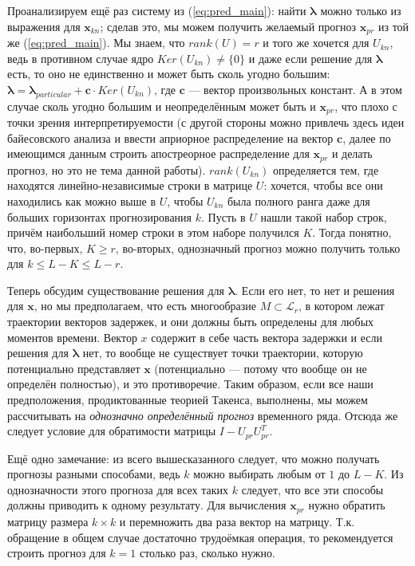 			 Проанализируем ещё раз систему из (\ref{eq:pred_main}): найти $ \boldsymbol{\lambda} $ можно только из выражения для $ \mathbf{x}_{kn} $; сделав это, мы можем получить желаемый прогноз $ \mathbf{x}_{pr} $ из той же (\ref{eq:pred_main}). Мы знаем, что $ rank(U) = r $ и того же хочется для $ U_{kn} $, ведь в противном случае ядро $ Ker(U_{kn}) \not= \{0\} $ и даже если решение для $ \boldsymbol{\lambda} $ есть, то оно не единственно и может быть сколь угодно большим: $ \boldsymbol{\lambda} = \boldsymbol{\lambda}_{particular} + \mathbf{c} \cdot Ker(U_{kn}) $, где $ \mathbf{c} $ --- вектор произвольных констант. А в этом случае сколь угодно большим и неопределённым может быть и $ \mathbf{x}_{pr} $, что плохо с точки зрения интерпретируемости (с другой стороны можно привлечь здесь идеи байесовского анализа и ввести априорное распределение на вектор $ \mathbf{c} $, далее по имеющимся данным строить апостреорное распределение для $ \mathbf{x}_{pr} $ и делать прогноз, но это не тема данной работы). $ rank(U_{kn}) $ определяется тем, где находятся линейно-независимые строки в матрице $ U $: хочется, чтобы все они находились как можно выше в $ U $, чтобы $ U_{kn} $ была полного ранга даже для больших горизонтах прогнозирования $ k $. Пусть в $ U $ нашли такой набор строк, причём наибольший номер строки в этом наборе получился $ K $. Тогда понятно, что, во-первых, $ K \ge r $, во-вторых, однозначный прогноз можно получить только для $ k \le L - K \le L - r $.
			 
			 Теперь обсудим существование решения для $ \boldsymbol{\lambda} $. Если его нет, то нет и решения для $ \mathbf{x} $, но мы предполагаем, что есть многообразие $ M \subset \mathcal{L}_r $, в котором лежат траектории векторов задержек, и они должны быть определены для любых моментов времени. Вектор $ x $ содержит в себе часть вектора задержки и если решения для $ \boldsymbol{\lambda} $ нет, то вообще не существует точки траектории, которую потенциально представляет $ \mathbf{x} $ (потенциально --- потому что вообще он не определён полностью), и это противоречие. Таким образом, если все наши предположения, продиктованные теорией Такенса, выполнены, мы можем рассчитывать на \textit{однозначно определённый прогноз} временного ряда. Отсюда же следует условие для обратимости матрицы $ I -  U_{pr}  U_{pr}^T $.
			 
			 Ещё одно замечание: из всего вышесказанного следует, что можно получать прогнозы разными способами, ведь $ k $ можно выбирать любым от $ 1 $ до $ L - K $. Из однозначности этого прогноза для всех таких $ k $ следует, что все эти способы должны приводить к одному результату. Для вычисления $ \mathbf{x}_{pr} $ нужно обратить матрицу размера $ k \times k $ и перемножить два раза вектор на матрицу. Т.к. обращение в общем случае достаточно трудоёмкая операция, то рекомендуется строить прогноз для $ k = 1 $ столько раз, сколько нужно.
			 
